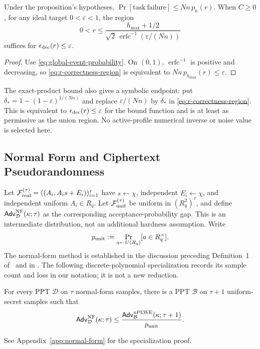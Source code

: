 \begin{corollary}
\label{cor:correctness-region}
Under the proposition's hypotheses,
\(\Pr[\mathrm{task\ failure}]\le Nn\,p_h(r)\).
When \(C\ge0\), for any ideal target \(0<\varepsilon<1\), the region
\begin{equation}
\label{eq:r-correctness-region}
 0<r\le
 \frac{h_{\max}+1/2}
 {\sqrt2\,\operatorname{erfc}^{-1}(\varepsilon/(Nn))}
\end{equation}
suffices for \(\epsilon_{\rm dec}(r)\le\varepsilon\).
\end{corollary}
\begin{proof}
Use \eqref{eq:global-event-probability}. On \((0,1)\),
\(\operatorname{erfc}^{-1}\) is positive and decreasing, so
\eqref{eq:r-correctness-region} is equivalent to
\(Nn\,p_{h_{\max}}(r)\le\varepsilon\).
\end{proof}

The exact-product bound also gives a symbolic endpoint: put
\(\delta_*=1-(1-\varepsilon)^{1/(Nn)}\) and replace
\(\varepsilon/(Nn)\) by \(\delta_*\) in
\eqref{eq:r-correctness-region}. This is equivalent to
\(\epsilon_{\rm dec}(r)\le\varepsilon\) for the bound function and is
at least as permissive as the union region. No active-profile numerical
inverse or noise value is selected here.


\subsection{Normal Form and Ciphertext Pseudorandomness}
\label{sec:normal-form}
Let \(\mathcal F_{\rm real}^{(\tau)}=((A_i,A_i s+E_i))_{i=1}^{\tau}\)
have \(s\leftarrow\chi\), independent \(E_i\leftarrow\chi\), and independent
uniform \(A_i\in R_q\). Let \(\mathcal F_{\rm unif}^{(\tau)}\) be uniform
in \((R_q^2)^\tau\), and define \(\mathsf{Adv}^{\rm NF}_{\mathcal D}(\kappa;\tau)\)
as the corresponding acceptance-probability gap. This is an intermediate
distribution, not an additional hardness assumption.
Write
\[
 p_{\rm unit}:=\Pr_{a\leftarrow U(R_q)}[a\in R_q^\times].
\]
The normal-form method is established in the discussion preceding
Definition~1 of~\cite{homomorphic} and in
\cite[Lemma~2.24 and Claim~2.25]{lpr2013toolkit}.
The following discrete-polynomial specialization records its sample count
and loss in our notation; it is not a new reduction.

\begin{corollary}
\label{cor:normal-form}
For every PPT \(\mathcal D\) on \(\tau\) normal-form samples, there is a
PPT \(\mathcal B\) on \(\tau+1\) uniform-secret samples such that
\[
 \mathsf{Adv}^{\rm NF}_{\mathcal D}(\kappa;\tau)
 \le \frac{\mathsf{Adv}^{\rm uPLWE}_{\mathcal B}(\kappa;\tau+1)}
              {p_{\rm unit}}.
\]
\end{corollary}
See Appendix~\ref{app:normal-form} for the specialization proof.

